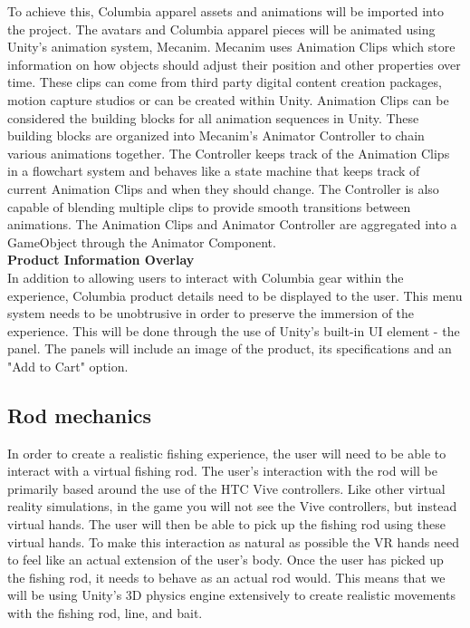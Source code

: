 \documentclass[10pt,journal,compsoc,onecolumn, draftclsnofoot]{IEEEtran}
\begin{document}
To achieve this, Columbia apparel assets and animations will be imported into the project. The avatars and Columbia apparel pieces will be animated using Unity's animation system, Mecanim. Mecanim uses Animation Clips which store information on how objects should adjust their position and other properties over time. These clips can come from third party digital content creation packages, motion capture studios or can be created within Unity. Animation Clips can be considered the building blocks for all animation sequences in Unity. These building blocks are organized into Mecanim's Animator Controller to chain various animations together. The Controller keeps track of the Animation Clips in a flowchart system and behaves like a state machine that keeps track of current Animation Clips and when they should change. The Controller is also capable of blending multiple clips to provide smooth transitions between animations. The Animation Clips and Animator Controller are aggregated into a GameObject through the Animator Component.\cite{unity_animation} \\

\hangindent=0.5cm \textbf{Product Information Overlay} \\

In addition to allowing users to interact with Columbia gear within the experience, Columbia product details need to be displayed to the user. This menu system needs to be unobtrusive in order to preserve the immersion of the experience. This will be done through the use of Unity's built-in UI element - the panel. The panels will include an image of the product, its specifications and an "Add to Cart" option. \\


\subsection{Rod mechanics}
In order to create a realistic fishing experience, the user will need to be able to interact with a virtual fishing rod.
The user's interaction with the rod will be primarily based around the use of the HTC Vive controllers.
Like other virtual reality simulations, in the game you will not see the Vive controllers, but instead virtual hands.
The user will then be able to pick up the fishing rod using these virtual hands.
To make this interaction as natural as possible the VR hands need to feel like an actual extension of the user's body.
Once the user has picked up the fishing rod, it needs to behave as an actual rod would.
This means that we will be using Unity's 3D physics engine extensively to create realistic movements with the fishing rod, line, and bait.
\end{document}
